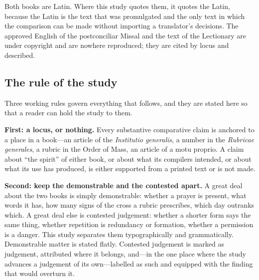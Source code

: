 Both books are Latin. Where this study quotes them, it quotes the Latin, because the Latin is the text that was promulgated and the only text in which the comparison can be made without importing a translator's decisions. The approved English of the postconciliar Missal and the text of the Lectionary are under copyright and are nowhere reproduced; they are cited by locus and described.

\subsection{The rule of the study}

Three working rules govern everything that follows, and they are stated here so that a reader can hold the study to them.

\textbf{First: a locus, or nothing.} Every substantive comparative claim is anchored to a place in a book---an article of the \emph{Institutio generalis}, a number in the \emph{Rubricae generales}, a rubric in the Order of Mass, an article of a motu proprio. A claim about ``the spirit'' of either book, or about what its compilers intended, or about what its use has produced, is either supported from a printed text or is not made.

\textbf{Second: keep the demonstrable and the contested apart.} A great deal about the two books is simply demonstrable: whether a prayer is present, what words it has, how many signs of the cross a rubric prescribes, which day outranks which. A great deal else is contested judgement: whether a shorter form says the same thing, whether repetition is redundancy or formation, whether a permission is a danger. This study separates them typographically and grammatically. Demonstrable matter is stated flatly. Contested judgement is marked as judgement, attributed where it belongs, and---in the one place where the study advances a judgement of its own---labelled as such and equipped with the finding that would overturn it.

